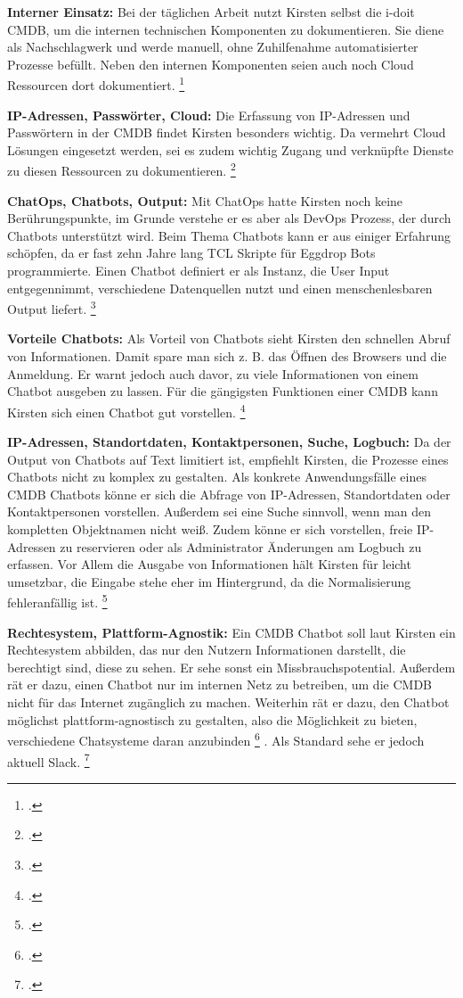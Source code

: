 \textbf{Interner Einsatz: }Bei der täglichen Arbeit nutzt Kirsten selbst die i-doit \acs{CMDB}, um die internen technischen Komponenten zu dokumentieren. Sie diene als Nachschlagwerk und werde manuell, ohne Zuhilfenahme automatisierter Prozesse befüllt. Neben den internen Komponenten seien auch noch Cloud Ressourcen dort dokumentiert. 
\footcite[Vgl.][o. \pno]{Kirsten_2019}

\textbf{IP-Adressen, Passwörter, Cloud: }Die Erfassung von IP-Adressen und Passwörtern in der \acs{CMDB} findet Kirsten besonders wichtig. Da vermehrt Cloud Lösungen eingesetzt werden, sei es zudem wichtig Zugang und verknüpfte Dienste zu diesen Ressourcen zu dokumentieren.
\footcite[Vgl.][o. \pno]{Kirsten_2019}

\textbf{ChatOps, Chatbots, Output: }Mit ChatOps hatte Kirsten noch keine Berührungspunkte, im Grunde verstehe er es aber als DevOps Prozess, der durch Chatbots unterstützt wird.  Beim Thema Chatbots kann er aus einiger Erfahrung schöpfen, da er fast zehn Jahre lang TCL Skripte für Eggdrop Bots programmierte. Einen Chatbot definiert er als Instanz, die User Input entgegennimmt, verschiedene Datenquellen nutzt und einen menschenlesbaren Output liefert.
\footcite[Vgl.][o. \pno]{Kirsten_2019}

\textbf{Vorteile Chatbots: }Als Vorteil von Chatbots sieht Kirsten den schnellen Abruf von Informationen. Damit spare man sich z. B. das Öffnen des Browsers und die Anmeldung. Er warnt jedoch auch davor, zu viele Informationen von einem Chatbot ausgeben zu lassen. Für die gängigsten Funktionen einer \acs{CMDB} kann Kirsten sich einen Chatbot gut vorstellen. 
\footcite[Vgl.][o. \pno]{Kirsten_2019}

\textbf{IP-Adressen, Standortdaten, Kontaktpersonen, Suche, Logbuch: }Da der Output von Chatbots auf Text limitiert ist, empfiehlt Kirsten, die Prozesse eines Chatbots nicht zu komplex zu gestalten. Als konkrete Anwendungsfälle eines \acs{CMDB} Chatbots könne er sich die Abfrage von IP-Adressen, Standortdaten oder Kontaktpersonen vorstellen. Außerdem sei eine Suche sinnvoll, wenn man den kompletten Objektnamen nicht weiß. Zudem könne er sich vorstellen, freie IP-Adressen zu reservieren oder als Administrator Änderungen am Logbuch zu erfassen. Vor Allem die Ausgabe von Informationen hält Kirsten für leicht umsetzbar, die Eingabe stehe eher im Hintergrund, da die Normalisierung fehleranfällig ist.
\footcite[Vgl.][o. \pno]{Kirsten_2019}

\textbf{Rechtesystem, Plattform-Agnostik: }Ein \acs{CMDB} Chatbot soll laut Kirsten ein Rechtesystem abbilden, das nur den Nutzern Informationen darstellt, die berechtigt sind, diese zu sehen. Er sehe sonst ein Missbrauchspotential. Außerdem rät er dazu, einen Chatbot nur im internen Netz zu betreiben, um die \acs{CMDB} nicht für das Internet zugänglich zu machen. Weiterhin rät er dazu, den Chatbot möglichst plattform-agnostisch zu gestalten, also die Möglichkeit zu bieten, \glqq{}verschiedene Chatsysteme daran anzubinden\grqq
\footcite[][o. \pno]{Kirsten_2019}
. Als Standard sehe er jedoch aktuell Slack.
\footcite[Vgl.][o. \pno]{Kirsten_2019}

